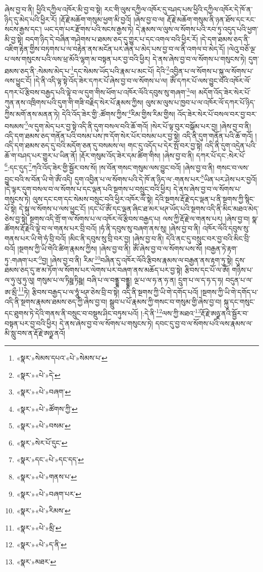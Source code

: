 ཞེས་བྱ་བ་ནི། ཕྱིའི་དཀྱིལ་འཁོར་མི་བྱ་བ་སྟེ། རང་གི་ལུས་དཀྱིལ་འཁོར་དུ་བཤད་པས་ཕྱིའི་དཀྱིལ་འཁོར་དེ་ཁོ་ན་ཉིད་དུ་མེད་པའི་ཕྱིར་རོ། །རྡོ་རྗེ་མཆོག་གསུམ་ཕྱག་མི་བྱའོ། །ཞེས་བྱ་བ་ལ། རྡོ་རྗེ་མཆོག་གསུམ་ནི་ཉན་ཐོས་དང་རང་སངས་རྒྱས་དང་། ཡང་དག་པར་རྫོགས་པའི་སངས་རྒྱས་ཏེ། དེ་རྣམས་ལ་ལུས་ལ་སོགས་པའི་རབ་ཏུ་འདུད་པའི་ཕྱག་མི་བྱ་སྟེ། བདག་ཉིད་དེ་བཞིན་གཤེགས་པ་ཐམས་ཅད་དུ་གྱུར་པ་དང་འགལ་བའི་ཕྱིར་རོ། །དེ་དག་ཐམས་ཅད་ནི་འཇིག་རྟེན་གྱིས་བཏགས་པ་ལ་བརྟེན་ནས་མངོན་པར་ཞེན་པ་མེད་པས་བྱ་བ་ལ་ནི་འགལ་བ་མེད་དོ། །ལེའུ་བཅོ་ལྔ་པ་ལས་གསུངས་པའི་ལས་ཕྲ་མོའི་ལྷག་མ་བསྟན་པར་བྱ་བའི་ཕྱིར། དེ་ནས་ཞེས་བྱ་བ་ལ་སོགས་པ་གསུངས་ཏེ། དུག་ཐམས་ཅད་ནི་:སེམས་མེད་པ་\footnote{«སྣར་»སེམས་དཔའ་«པེ་»སེམས་པ་}དང་སེམས་ཡོད་པའི་རྣམ་པ་མང་པོ། དེའི་\footnote{«སྣར་»«པེ་»དེ་}འབྱིན་པ་ལ་སོགས་པ་སྐུ་ལ་སོགས་པ་ལས་ཕྱུང་ངོ། །དེ་ནི་འདི་ལྟ་སྟེ་འོད་ཟེར་དཀར་པོ་ཞེས་བྱ་བ་ལ་སོགས་པ་ལ། ཨོཾ་དཀར་པོ་ལས་བྱུང་བའི་འཁོར་ལོ་དཀར་པོ་རྩིབས་བརྒྱད་པའི་ལྟེ་བ་ལ་དུག་གིས་ཕོག་པ་འཁོར་ལོའི་དབུས་སུ་གཞག་\footnote{«སྣར་»«པེ་»བཞག་}ལ། མདོག་འོད་ཟེར་སེར་པོ་ཀུན་ནས་འཁྲིགས་པའི་དུག་གི་གཟི་བརྗིད་སེར་པོ་རྣམས་ཀྱིས། ལུས་མ་ལུས་པ་ཁྱབ་པ་ལ་འཁོར་ལོ་དཀར་པོ་ཉིད་ཀྱིས་མགོ་ནས་མནན་ཏེ། དེའི་འོད་ཟེར་གྱི་:ཚོགས་ཀྱིས་\footnote{«སྣར་»«པེ་»ཚོགས་ཀྱི་}རིམ་གྱིས་རིམ་གྱིས། འོད་ཟེར་སེར་པོ་བསལ་བར་བྱ་བར་བསམས་\footnote{«སྣར་»«པེ་»བསམ་}ལ་དུག་མེད་པར་བྱ་སྟེ་འདི་ནི་དུག་བསལ་བའི་ཆོ་གའོ། །སེར་པོ་ལྟ་བུར་བསྒོམ་པར་བྱ། །ཞེས་བྱ་བ་ནི། འདི་དག་ཐམས་ཅད་གནོན་པའི་བསམ་པས་ཁ་དོག་སེར་པོར་བསམ་པར་བྱ་སྟེ། འདི་ནི་དུག་གནོན་པའི་ཆོ་གའོ། །འདི་དག་ཐམས་ཅད་དུ་བའི་མདོག་ཅན་དུ་བསམས་ལ། གང་དུ་འདོད་པ་དེར་སྤོ་བར་བྱ་སྟེ། འདི་ནི་དུག་འདྲེན་པའི་ཆོ་ག་བཤད་པར་གྱུར་པ་ཡིན་ནོ། །རྡོར་གསུམ་འོད་ཟེར་དམ་ཚིག་གིས། །ཞེས་བྱ་བ་ནི། དཀར་པོ་དང་:སེར་པོ་\footnote{«སྣར་»སེར་པོ་དུང་}:དང་དུད་\footnote{«སྣར་»དང་«པེ་»དང་དད་}ཀའི་འོད་ཟེར་གྱི་སྦྱོར་བས་སོ། །ས་བོན་གསང་གསུམ་ལས་བྱུང་བའོ། །ཞེས་བྱ་བ་ནི། གསང་བ་ལས་བྱུང་བའི་ས་བོན་ཡི་གེ་ཨོཾ་འདི། དུག་འབྱིན་པ་ལ་སོགས་པའི་དེ་ཁོ་ན་ཉིད་ལ་:གནས་པར་\footnote{«སྣར་»«པེ་»གནས་པ་}ཡིན་པར་ཤེས་པར་བྱའོ། །དེ་ལྟར་དུག་བསལ་བ་ལ་སོགས་པ་དང་ལྡན་པའི་སྔགས་པ་བསྲུང་བའི་ཕྱིར། དེ་ནས་ཞེས་བྱ་བ་ལ་སོགས་པ་གསུངས་ཏེ། ལུས་དང་ངག་དང་སེམས་བསྲུང་བའི་ཕྱིར་འཁོར་ལོ་སྟེ། དེའི་སྔགས་རྡོ་རྗེ་དང་ལྡན་པ་ནི་སྔགས་ཀྱི་སྙིང་པོ་སྟེ། དེ་སྐུ་ལ་སོགས་པ་ལས་ཕྱུང་ངོ། །དང་པོ་ཨོཾ་དང་ལྡན་ཞིང་ཐ་མར་ཕཊ་ཡོད་པའི་སྔགས་འདི་ནི་མིང་མཐའ་མེད་ཅེས་བྱ་སྟེ། སྔགས་འདི་གྲོ་ག་ལ་སོགས་པ་ལ་འཁོར་ལོ་རྩིབས་བརྒྱད་པ། ལས་ཀྱི་རྡོ་རྗེ་ལ་གནས་པར། །ཞེས་བྱ་བ། སྣ་ཚོགས་རྡོ་རྗེའི་ལྟེ་བ་ལ་གནས་པར་བྲི་བའོ། །ཧཾ་ནི་དབུས་སུ་བཞག་ནས་སུ། །ཞེས་བྱ་བ་ནི། འཁོར་ལོའི་དབུས་སུ་གནས་པར་ཡི་གེ་ཧཾ་བྲི་བའོ། །མིང་ནི་དབུས་སུ་བྲི་བར་བྱ། །ཞེས་བྱ་བ་ནི། དེའི་ནང་དུ་བསྲུང་བར་བྱ་བའི་མིང་བྲི་བའོ། །སྔགས་ཀྱི་ཡི་གེའི་ཚིག་རྣམས་ཀྱིས། །ཞེས་བྱ་བ་ནི། ཨོཾ་ཞེས་བྱ་བ་ལ་སོགས་པས་སོ། །བརྒྱན་ཏེ་རྟག་ཏུ་:གཞག་པར་\footnote{«སྣར་»«པེ་»བཞག་པར་}བྱ། །ཞེས་བྱ་བ་ནི། རིམ་\footnote{«སྣར་»«པེ་»རིམས་}བཞིན་དུ་འཁོར་ལོའི་རྩིབས་རྣམས་ལ་བརྒྱན་ནས་རྟག་ཏུ་སྟེ། དུས་ཐམས་ཅད་དུ་ཟ་མ་ཏོག་ལ་སོགས་པར་ལེགས་པར་བཞག་ནས་མཆོད་པར་བྱ་སྟེ། རྩིབས་དང་པོ་ལ་ཨོཾ། གཉིས་པ་ལ་ཧུ་ལུ་ཧུ་ལུ། གསུམ་པ་ལ་ཏིཥྛ་ཏིཥྛ། བཞི་པ་ལ་བནྡྷ་བནྡྷ། ལྔ་པ་ལ་ཧ་ན་ཧ་ན། དྲུག་པ་ལ་ད་ཧ་ད་ཧ། བདུན་པ་ལ་ཨ་མྲྀ་\footnote{«སྣར་»«པེ་»མྲི་}ཏེ། རྩིབས་བརྒྱད་པ་ལ་ཧཱུཾ་ཕཊ་ཅེས་བྲི་བ་སྟེ། འདི་ནི་སྔགས་ཀྱི་ཡི་གེ་དགོད་པའོ། །སྔགས་ཀྱི་ཡི་གེ་དགོད་པ་འདི་ནི་སྔགས་རྣམས་ཐམས་ཅད་ཀྱི་ཞེས་བྱ་བ། སྒྲུབ་པ་པོ་རྣམས་ཀྱི་གསང་བ་གསུམ་གྱི་ཞེས་བྱ་བ། སྐུ་དང་གསུང་དང་ཐུགས་ཏེ་དེའི་གནས་ནི་བསྲུང་བ་བསྡུས་ཤིང་བཏུས་པའོ། །:དེ་ནི་\footnote{«སྣར་»«པེ་»ད་ནི་}ལས་ཀྱི་མཐའ་\footnote{«སྣར་»མཐར་}རྡོ་རྗེ་ཨཉྫ་ནའི་སྦྱོར་བ་བསྟན་པར་བྱ་བའི་ཕྱིར། དེ་ནས་ཞེས་བྱ་བ་ལ་སོགས་པ་གསུངས་ཏེ། དབང་དུ་བྱ་བ་ལ་སོགས་པའི་ལས་རྣམས་ལ་མི་སླུ་བས་ན་རྡོ་རྗེ་ཨཉྫ་ནའོ། 
